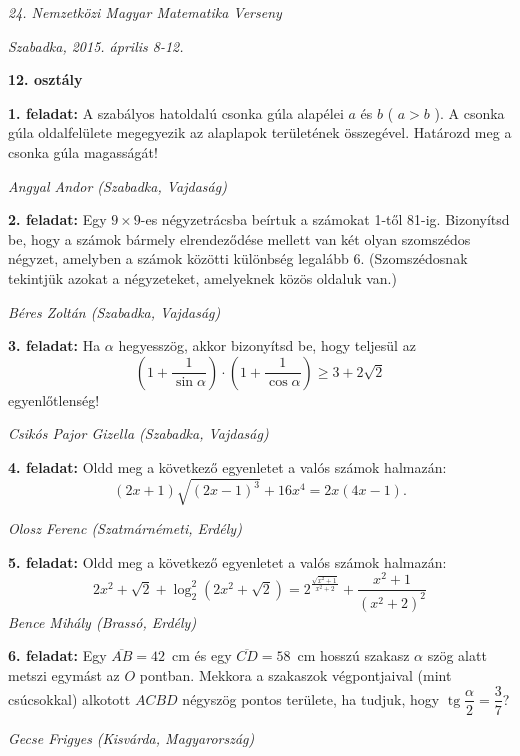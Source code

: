 \documentclass[a4paper,10pt]{article}
\newcommand{\ki}[2]{\hfill {\it #1 (#2)}\medskip}
\newcommand{\tg}{\mathop{\mathrm{tg}}\nolimits}
\begin{document}
\begin{center} \Large {\em 24. Nemzetközi Magyar Matematika Verseny} \end{center}
\begin{center} \large{\em Szabadka, 2015. április 8-12.} \end{center}
\smallskip
\begin{center} \large{\bf 12. osztály} \end{center}
\bigskip 

{\bf 1. feladat: } A szabályos hatoldalú csonka gúla alapélei $a$ és $b$ ( $a > b$ ). A csonka gúla
oldalfelülete megegyezik az alaplapok területének összegével. Határozd meg a csonka gúla magasságát!

\ki{Angyal Andor}{Szabadka, Vajdaság}\medskip

{\bf 2. feladat: } Egy $9 \times 9$-es négyzetrácsba beírtuk a számokat 1-től 81-ig. Bizonyítsd be,
hogy a számok bármely elrendeződése mellett van két olyan szomszédos négyzet,
amelyben a számok közötti különbség legalább 6. (Szomszédosnak tekintjük
azokat a négyzeteket, amelyeknek közös oldaluk van.)

\ki{Béres Zoltán}{Szabadka, Vajdaság}\medskip

{\bf 3. feladat: } Ha $\alpha$ hegyesszög, akkor bizonyítsd be, hogy teljesül az
$$\left(1+\frac{1}{\sin \alpha}\right)\cdot\left(1+\frac{1}{\cos \alpha}\right)\ge 3+2\sqrt 2$$
egyenlőtlenség!

\ki{Csikós Pajor Gizella}{Szabadka, Vajdaság}\medskip

{\bf 4. feladat: } Oldd meg a következő egyenletet a valós számok halmazán:
$$(2x+1)\sqrt{(2x-1)^3}+16x^4=2x(4x-1).$$

\ki{Olosz Ferenc}{Szatmárnémeti, Erdély}\medskip

{\bf 5. feladat: } Oldd meg a következő egyenletet a valós számok halmazán:
$$2x^2+\sqrt{2}+\log_2^2\left(2x^2+\sqrt 2\right)=2^{\frac{\sqrt{x^2+1}}{x^2+2}}+\frac{x^2+1}{(x^2+2)^2}$$
\ki{Bence Mihály}{Brassó, Erdély}\medskip

{\bf 6. feladat: } Egy $\overline{AB}=42$~cm és egy $\overline{CD}=58$~cm hosszú szakasz $\alpha$ szög alatt metszi
egymást az $O$ pontban. Mekkora a szakaszok végpontjaival (mint csúcsokkal)
alkotott $ACBD$ négyszög pontos területe, ha tudjuk, hogy 
$\tg\dfrac{\alpha}{2}=\dfrac{3}{7}$?

\ki{Gecse Frigyes}{Kisvárda, Magyarország}\medskip
\end{document}
